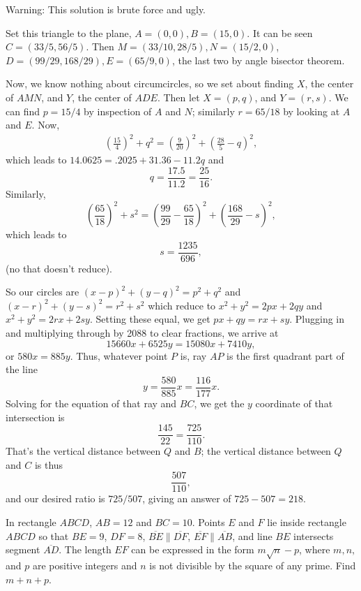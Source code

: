\begin{solution}[name={Solution by RminusQ}]
	Warning: This solution is brute force and ugly.
	
	Set this triangle to the plane, $ A = (0,0), B = (15,0)$. It can be seen $ C = ({33}/5, {56}/5)$. Then $ M = ({33}/{10}, {28}/5), N = ({15}/2,0)$, $ D = ({99}/{29}, {168}/{29}), E = ({65}/9, 0)$, the last two by angle bisector theorem.
	
	Now, we know nothing about circumcircles, so we set about finding $X$, the center of $AMN$, and $Y$, the center of $ADE$. Then let $ X = (p,q)$, and $Y = (r,s)$. We can find $ p = {15}/4$ by inspection of $A$ and $N$; similarly $ r ={65}/{18}$ by looking at $A$ and $E$. Now,
	\begin{align*}
		\left(\frac{15}4\right)^2 + q^2 = \left(\frac9{20}\right)^2 + \left(\frac{28}5-q\right)^2,
	\end{align*}
	which leads to $ 14.0625 = .2025 + 31.36 - 11.2q$ and $$ q = \frac{17.5}{11.2} = \frac{25}{16}.$$
	Similarly, $$ \left(\frac{65}{18}\right)^2 + s^2 = \left(\frac{99}{29} - \frac{65}{18}\right)^2 + \left(\frac{168}{29} - s\right)^2,$$ which leads to $$ s = \frac{1235}{696},$$ (no that doesn't reduce).
	
	So our circles are $ (x-p)^2 + (y-q)^2 = p^2 + q^2$ and $ (x-r)^2 + (y-s)^2 = r^2 + s^2$ which reduce to $ x^2 + y^2 = 2px + 2qy$ and $ x^2 + y^2 = 2rx + 2sy$. Setting these equal, we get $ px+qy = rx+sy$. Plugging in and multiplying through by 2088 to clear fractions, we arrive at $$ 15660x+6525y = 15080x+7410y,$$ or $ 580x = 885y$. Thus, whatever point $P$ is, ray $AP$ is the first quadrant part of the line $$ y = \frac{580}{885}x = \frac{116}{177}x.$$
	Solving for the equation of that ray and $BC$, we get the $y$ coordinate of that intersection is $$\frac{145}{22} = \frac{725}{110}.$$ That's the vertical distance between $Q$ and $B$; the vertical distance between $Q$ and $C$ is thus $$ \frac{507}{110},$$ and our desired ratio is ${725}/{507}$, giving an answer of $ 725 - 507 = \boxed{218}$.
\end{solution}













\begin{question}[name={2011 AIME I, \href{https://artofproblemsolving.com/community/c4p2209660}{Problem 2}}]
	In rectangle $ABCD$, $AB=12$ and $BC=10$. Points $E$ and $F$ lie inside rectangle $ABCD$ so that $BE=9$, $DF=8$, $\overline{BE} \parallel \overline{DF}$, $\overline{EF} \parallel \overline{AB}$, and line $BE$ intersects segment $\overline{AD}$. The length $EF$ can be expressed in the form $m\sqrt{n}-p$, where $m,n,$ and $p$ are positive integers and $n$ is not divisible by the square of any prime. Find $m+n+p$.
\end{question}



